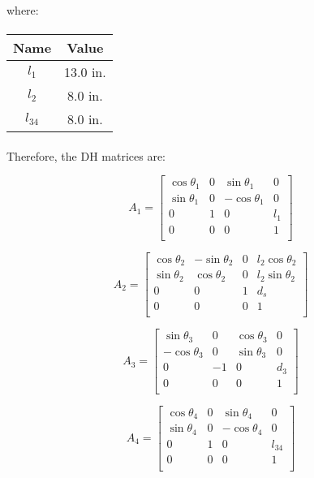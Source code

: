 \documentclass{article}
\begin{document}
where:

\paragraph{}
\begin{tabular}{|c|c|}
\hline
Name & Value \\
\hline
$l_1$ & 13.0 in.\\
$l_2$ & 8.0 in.\\
$l_{34}$ & 8.0 in.\\
\hline
\end{tabular}
\paragraph{}

Therefore, the DH matrices are:

\[ A_1 = \left[ 
	\begin{matrix}
		\cos \theta_1 & 0 & \sin \theta_1 & 0 \\
		\sin \theta_1 & 0 & - \cos \theta_1 & 0 \\
		0 & 1 & 0 & l_1 \\
		0 & 0 & 0 & 1 \\
	\end{matrix} \right] \]

\[ A_2 = \left[ 
	\begin{matrix}
		\cos \theta_2 & - \sin \theta_2 & 0 & l_2 \cos \theta_2 \\
		\sin \theta_2 & \cos \theta_2 & 0 & l_2 \sin \theta_2\\
		0 & 0 & 1 & d_s \\
		0 & 0 & 0 & 1 \\
	\end{matrix} \right] \]

\[ A_3 = \left[ 
	\begin{matrix}
		\sin \theta_3 & 0 & \cos \theta_3 & 0 \\
		- \cos \theta_3 & 0 & \sin \theta_3 & 0 \\
		0 & -1 & 0 & d_3 \\
		0 & 0 & 0 & 1 \\
	\end{matrix} \right] \]


\[ A_4 = \left[ 
	\begin{matrix}
		\cos \theta_4 & 0 & \sin \theta_4 & 0 \\
		\sin \theta_4 & 0 & - \cos \theta_4 & 0 \\
		0 & 1 & 0 & l_{34} \\
		0 & 0 & 0 & 1 \\
	\end{matrix} \right] \]
\end{document}
